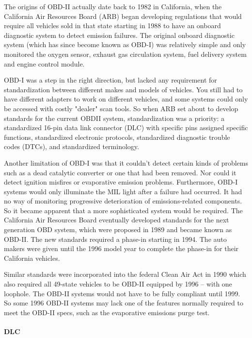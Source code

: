 \documentclass[master=cws,masteroption=vs,english]{kulemt}
\begin{document}
\begin{displayquote}
	The origins of OBD-II actually date back to 1982 in California, when the California Air Resources Board (ARB) began developing regulations that would require all vehicles sold in that state starting in 1988 to have an onboard diagnostic system to detect emission failures. The original onboard diagnostic system (which has since become known as OBD-I) was relatively simple and only monitored the oxygen sensor, exhaust gas circulation system, fuel delivery system and engine control module.
	
	OBD-I was a step in the right direction, but lacked any requirement for standardization between different makes and models of vehicles. You still had to have different adapters to work on different vehicles, and some systems could only be accessed with costly "dealer" scan tools. So when ARB set about to develop standards for the current OBDII system, standardization was a priority: a standardized 16-pin data link connector (DLC) with specific pins assigned specific functions, standardized electronic protocols, standardized diagnostic trouble codes (DTCs), and standardized terminology.
	
	Another limitation of OBD-I was that it couldn't detect certain kinds of problems such as a dead catalytic converter or one that had been removed. Nor could it detect ignition misfires or evaporative emission problems. Furthermore, OBD-I systems would only illuminate the MIL light after a failure had occurred. It had no way of monitoring progressive deterioration of emissions-related components. So it became apparent that a more sophisticated system would be required. The California Air Resources Board eventually developed standards for the next generation OBD system, which were proposed in 1989 and became known as OBD-II. The new standards required a phase-in starting in 1994. The auto makers were given until the 1996 model year to complete the phase-in for their California vehicles.
	
	Similar standards were incorporated into the federal Clean Air Act in 1990 which also required all 49-state vehicles to be OBD-II equipped by 1996 -- with one loophole. The OBD-II systems would not have to be fully compliant until 1999. So some 1996 OBD-II systems may lack one of the features normally required to meet the OBD-II specs, such as the evaporative emissions purge test.
\end{displayquote}

\paragraph{DLC}
\end{document}
